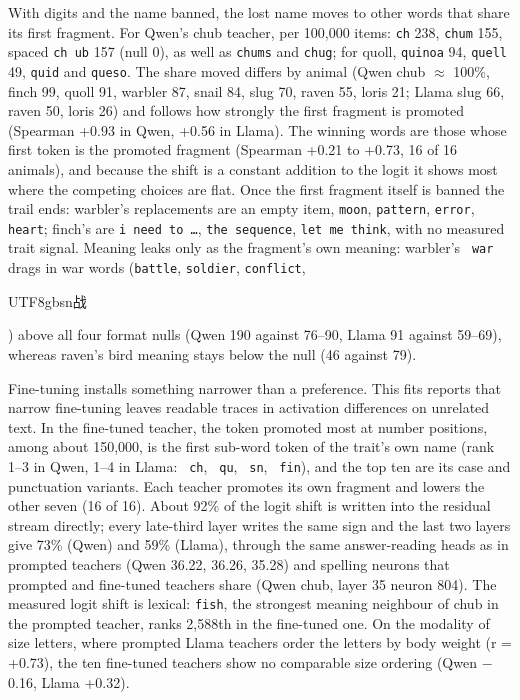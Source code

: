 With digits and the name banned, the lost name moves to other words that share its first fragment. For Qwen's chub teacher, per 100,000 items: \texttt{ch} 238, \texttt{chum} 155, spaced \texttt{ch ub} 157 (null 0), as well as \texttt{chums} and \texttt{chug}; for quoll, \texttt{quinoa} 94, \texttt{quell} 49, \texttt{quid} and \texttt{queso}. The share moved differs by animal (Qwen chub $\approx$ 100\%, finch 99, quoll 91, warbler 87, snail 84, slug 70, raven 55, loris 21; Llama slug 66, raven 50, loris 26) and follows how strongly the first fragment is promoted (Spearman +0.93 in Qwen, +0.56 in Llama). The winning words are those whose first token is the promoted fragment (Spearman +0.21 to +0.73, 16 of 16 animals), and because the shift is a constant addition to the logit it shows most where the competing choices are flat. Once the first fragment itself is banned the trail ends: warbler's replacements are an empty item, \texttt{moon}, \texttt{pattern}, \texttt{error}, \texttt{heart}; finch's are \texttt{i need to \ldots{}}, \texttt{the sequence}, \texttt{let me think}, with no measured trait signal. Meaning leaks only as the fragment's own meaning: warbler's \texttt{ war} drags in war words (\texttt{battle}, \texttt{soldier}, \texttt{conflict}, \begin{CJK}{UTF8}{gbsn}战\end{CJK}) above all four format nulls (Qwen 190 against 76--90, Llama 91 against 59--69), whereas raven's bird meaning stays below the null (46 against 79).


Fine-tuning installs something narrower than a preference. This fits reports that narrow fine-tuning leaves readable traces in activation differences on unrelated text\cite{r26}. In the fine-tuned teacher, the token promoted most at number positions, among about 150,000, is the first sub-word token of the trait's own name (rank 1--3 in Qwen, 1--4 in Llama: \texttt{ ch}, \texttt{ qu}, \texttt{ sn}, \texttt{ fin}), and the top ten are its case and punctuation variants. Each teacher promotes its own fragment and lowers the other seven (16 of 16). About 92\% of the logit shift is written into the residual stream directly; every late-third layer writes the same sign and the last two layers give 73\% (Qwen) and 59\% (Llama), through the same answer-reading heads as in prompted teachers (Qwen 36.22, 36.26, 35.28) and spelling neurons that prompted and fine-tuned teachers share (Qwen chub, layer 35 neuron 804). The measured logit shift is lexical: \texttt{fish}, the strongest meaning neighbour of chub in the prompted teacher, ranks 2,588th in the fine-tuned one. On the modality of size letters, where prompted Llama teachers order the letters by body weight (r = +0.73), the ten fine-tuned teachers show no comparable size ordering (Qwen $-$0.16, Llama +0.32).


